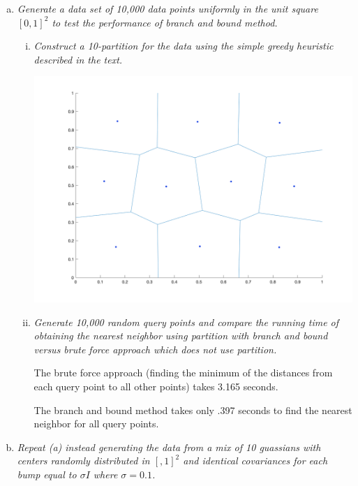 \documentclass{article}
\begin{document}
\begin{enumerate}[(a)]
  \item \textit{Generate a data set of 10,000 data points uniformly in the unit square $[0,1]^2$
    to test the performance of branch and bound method.}

    \begin{enumerate}[i.]
      \item \textit{Construct a 10-partition for the data using the simple greedy heuristic 
        described in the text.}

        \begin{center}
        \includegraphics[width=\textwidth]{616ai.png}
        \end{center}

      \item \textit{Generate 10,000 random query points and compare the running time of obtaining
        the nearest neighbor using partition with branch and bound versus brute force approach
        which does not use partition.}

        The brute force approach (finding the minimum of the distances from each query point to
        all other points) takes 3.165 seconds.

        The branch and bound method takes only .397 seconds to find the nearest neighbor for all
        query points.

    \end{enumerate}

  \item \textit{Repeat (a) instead generating the data from a mix of 10 guassians with centers 
    randomly distributed in $[,1]^2$ and identical covariances for each bump equal to $\sigma I$
    where $\sigma = 0.1$.}


\end{enumerate}
\end{document}

